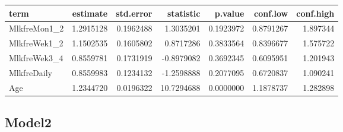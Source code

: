 \documentclass[
]{article}
\newenvironment{Shaded}{\begin{snugshade}}{\end{snugshade}}
\newcommand{\DataTypeTok}[1]{\textcolor[rgb]{0.13,0.29,0.53}{#1}}
\newcommand{\KeywordTok}[1]{\textcolor[rgb]{0.13,0.29,0.53}{\textbf{#1}}}
\newcommand{\NormalTok}[1]{#1}
\newcommand{\OperatorTok}[1]{\textcolor[rgb]{0.81,0.36,0.00}{\textbf{#1}}}
\newcommand{\OtherTok}[1]{\textcolor[rgb]{0.56,0.35,0.01}{#1}}
\newcommand{\StringTok}[1]{\textcolor[rgb]{0.31,0.60,0.02}{#1}}
\begin{document}
\begin{longtable}[]{@{}lrrrrrr@{}}
\toprule
term & estimate & std.error & statistic & p.value & conf.low &
conf.high\tabularnewline
\midrule
\endhead
MlkfreMon1\_2 & 1.2915128 & 0.1962488 & 1.3035201 & 0.1923972 &
0.8791267 & 1.897344\tabularnewline
MlkfreWek1\_2 & 1.1502535 & 0.1605802 & 0.8717286 & 0.3833564 &
0.8396677 & 1.575722\tabularnewline
MlkfreWek3\_4 & 0.8559781 & 0.1731919 & -0.8979082 & 0.3692345 &
0.6095951 & 1.201943\tabularnewline
MlkfreDaily & 0.8559983 & 0.1234132 & -1.2598888 & 0.2077095 & 0.6720837
& 1.090241\tabularnewline
Age & 1.2344720 & 0.0196322 & 10.7294688 & 0.0000000 & 1.1878737 &
1.282898\tabularnewline
\bottomrule
\end{longtable}

\hypertarget{model2-6}{%
\subsection{Model2}\label{model2-6}}

\begin{Shaded}
\end{Shaded}
\end{document}
